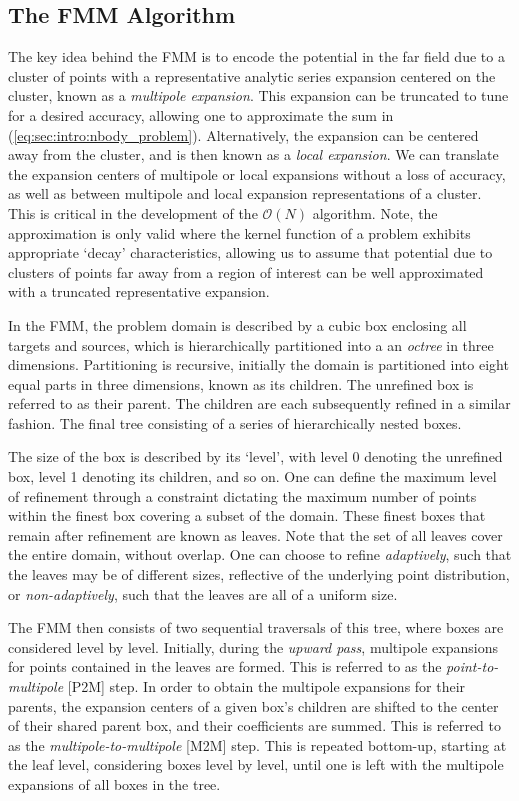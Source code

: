 \documentclass{IEEEcsmag}
\begin{document}
\subsection{The FMM Algorithm}\label{sec:intro:algorithm}

The key idea behind the FMM is to encode the potential in the far field due to a cluster of points with a representative analytic series expansion centered on the cluster, known as a \textit{multipole expansion}. This expansion can be truncated to tune for a desired accuracy, allowing one to approximate the sum in (\ref{eq:sec:intro:nbody_problem}). Alternatively, the expansion can be centered away from the cluster, and is then known as a \textit{local expansion}. We can translate the expansion centers of multipole or local expansions without a loss of accuracy, as well as between multipole and local expansion representations of a cluster. This is critical in the development of the $\mathcal{O}(N)$ algorithm. Note, the approximation is only valid where the kernel function of a problem exhibits appropriate `decay' characteristics, allowing us to assume that potential due to clusters of points far away from a region of interest can be well approximated with a truncated representative expansion.

In the FMM, the problem domain is described by a cubic box enclosing all targets and sources, which is hierarchically partitioned into a an \textit{octree} in three dimensions. Partitioning is recursive, initially the domain is partitioned into eight equal parts in three dimensions, known as its children. The unrefined box is referred to as their parent. The children are each subsequently refined in a similar fashion. The final tree consisting of a series of hierarchically nested boxes.

The size of the box is described by its `level', with level 0 denoting the unrefined box, level 1 denoting its children, and so on. One can define the maximum level of refinement through a  constraint dictating the maximum number of points within the finest box covering a subset of the domain. These finest boxes that remain after refinement are known as leaves. Note that the set of all leaves cover the entire domain, without overlap. One can choose to refine \textit{adaptively}, such that the leaves may be of different sizes, reflective of the underlying point distribution, or \textit{non-adaptively}, such that the leaves are all of a uniform size.

The FMM then consists of two sequential traversals of this tree, where boxes are considered level by level. Initially, during the \textit{upward pass}, multipole expansions for points contained in the leaves are formed. This is referred to as the \textit{point-to-multipole} [P2M] step. In order to obtain the multipole expansions for their parents, the expansion centers of a given box's children are shifted to the center of their shared parent box, and their coefficients are summed. This is referred to as the \textit{multipole-to-multipole} [M2M] step. This is repeated bottom-up, starting at the leaf level, considering boxes level by level, until one is left with the multipole expansions of all boxes in the tree.
\end{document}
